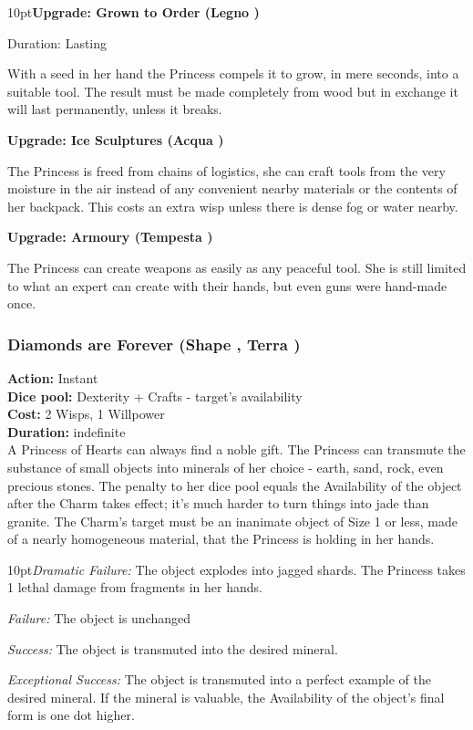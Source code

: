 \begin{myindentpar}{10pt}\textbf{Upgrade: Grown to Order (Legno \textbullet\textbullet)}

Duration: Lasting

With a seed in her hand the Princess compels it to grow, in mere seconds, into a suitable tool. The result must be made completely from wood but in exchange it will last permanently, unless it breaks.

\textbf{Upgrade: Ice Sculptures (Acqua \textbullet\textbullet)}

The Princess is freed from chains of logistics, she can craft tools from the very moisture in the air instead of any convenient nearby materials or the contents of her backpack. This costs an extra wisp unless there is dense fog or water nearby.

\textbf{Upgrade: Armoury (Tempesta \textbullet\textbullet)}

The Princess can create weapons as easily as any peaceful tool. She is still limited to what an expert can create with their hands, but even guns were hand-made once.\end{myindentpar}

\subsubsection*{Diamonds are Forever (Shape \textbullet\textbullet\textbullet, Terra \textbullet\textbullet\textbullet)}

\textbf{Action:} Instant\\
\textbf{Dice pool:} Dexterity + Crafts - target's availability\\
\textbf{Cost:} 2 Wisps, 1 Willpower\\
\textbf{Duration:} indefinite\\

\noindent A Princess of Hearts can always find a noble gift. The Princess can transmute the substance of small objects into minerals of her choice - earth, sand, rock, even precious stones. The penalty to her dice pool equals the Availability of the object after the Charm takes effect; it’s much harder to turn things into jade than granite. The Charm’s target must be an inanimate object of Size 1 or less, made of a nearly homogeneous material, that the Princess is holding in her hands.

\begin{myindentpar}{10pt}\emph{Dramatic Failure:} The object explodes into jagged shards. The Princess takes 1 lethal damage from fragments in her hands.

\emph{Failure:} The object is unchanged

\emph{Success:} The object is transmuted into the desired mineral.

\emph{Exceptional Success:} The object is transmuted into a perfect example of the desired mineral. If the mineral is valuable, the Availability of the object’s final form is one dot higher.\end{myindentpar}

